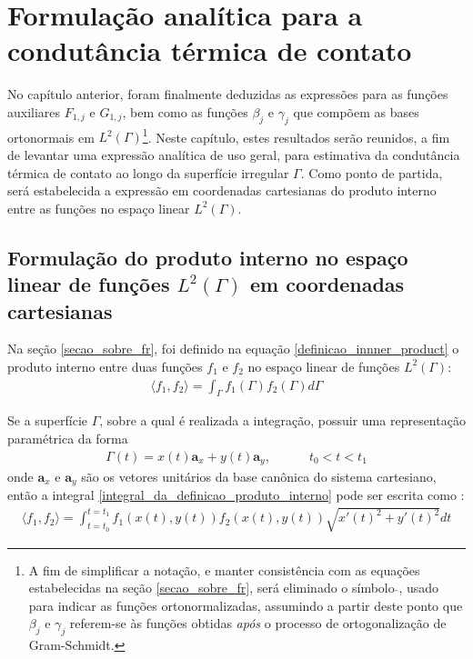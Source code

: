 \section{Formulação analítica para a condutância térmica de contato}

No capítulo anterior, foram finalmente deduzidas as expressões para as funções auxiliares $F_{1,j}$ e $G_{1,j}$, bem como as funções $\beta_j$ e $\gamma_j$ que compõem as bases ortonormais em $L^2(\Gamma)$\footnote{A fim de simplificar a notação, e manter consistência com as equações estabelecidas na seção \ref{secao_sobre_fr}, será eliminado o símbolo $\hat{}$, usado para indicar as funções ortonormalizadas, assumindo a partir deste ponto que $\beta_j$ e $\gamma_j$ referem-se às funções obtidas \textit{após} o processo de ortogonalização de Gram-Schmidt.}. Neste capítulo, estes resultados serão reunidos, a fim de levantar uma expressão analítica de uso geral, para estimativa da condutância térmica de contato ao longo da superfície irregular $\Gamma$. Como ponto de partida, será estabelecida a expressão em coordenadas cartesianas do produto interno entre as funções no espaço linear $L^2(\Gamma)$.

\subsection{Formulação do produto interno no espaço linear de funções $L^2(\Gamma)$ em coordenadas cartesianas}

Na seção \ref{secao_sobre_fr}, foi definido na equação \eqref{definicao_innner_product} o produto interno entre duas funções $f_1$ e $f_2$ no espaço linear de funções $L^2(\Gamma)$:
\begin{align}
\langle f_1, f_2\rangle = \int_\Gamma f_1(\Gamma) f_2(\Gamma) d\Gamma \label{integral_da_definicao_produto_interno}
\end{align}

Se a superfície $\Gamma$, sobre a qual é realizada a integração, possuir uma representação paramétrica da forma
\begin{align}
\Gamma(t) = x(t)\mathbf{a}_x + y(t)\mathbf{a}_y, \quad\quad\quad t_0 < t < t_1
\end{align}
onde $\mathbf{a}_x$ e $\mathbf{a}_y$ são os vetores unitários da base canônica do sistema cartesiano, então a integral \eqref{integral_da_definicao_produto_interno} pode ser escrita como \citep{livro_stewart_2}:
\begin{align}
\langle f_1, f_2\rangle = \int_{t=t_0}^{t=t_1}f_1(x(t), y(t))f_2(x(t), y(t))\sqrt{x'(t)^2 + y'(t)^2}dt \label{integral_da_definicao_produto_interno_2}
\end{align}

